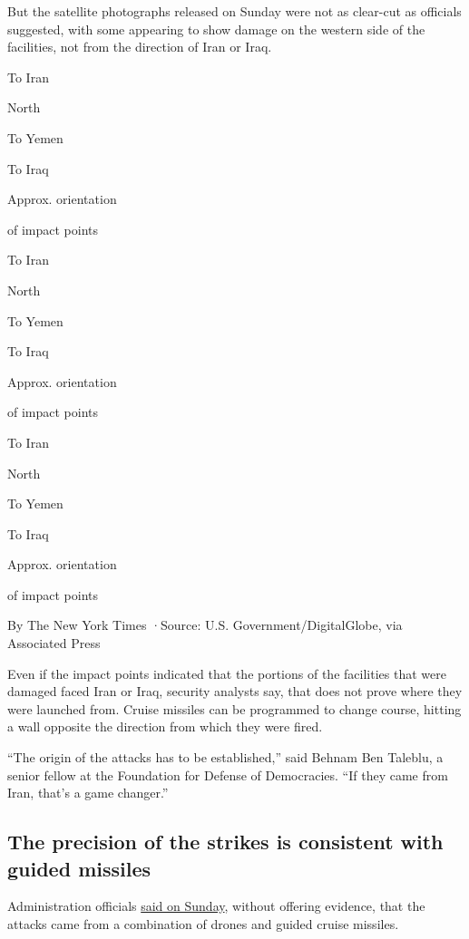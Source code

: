 But the satellite photographs released on Sunday were not as clear-cut
as officials suggested, with some appearing to show damage on the
western side of the facilities, not from the direction of Iran or Iraq.

To Iran

North

To Yemen

To Iraq

Approx. orientation

of impact points

To Iran

North

To Yemen

To Iraq

Approx. orientation

of impact points

To Iran

North

To Yemen

To Iraq

Approx. orientation

of impact points

By The New York Times ·Source: U.S. Government/DigitalGlobe, via
Associated Press

Even if the impact points indicated that the portions of the facilities
that were damaged faced Iran or Iraq, security analysts say, that does
not prove where they were launched from. Cruise missiles can be
programmed to change course, hitting a wall opposite the direction from
which they were fired.

``The origin of the attacks has to be established,'' said Behnam Ben
Taleblu, a senior fellow at the Foundation for Defense of Democracies.
``If they came from Iran, that's a game changer.''

\hypertarget{the-precision-of-the-strikes-is-consistent-with-guided-missiles}{%
\subsection{The precision of the strikes is consistent with guided
missiles}\label{the-precision-of-the-strikes-is-consistent-with-guided-missiles}}

Administration officials
\href{https://www.nytimes3xbfgragh.onion/2019/09/15/world/middleeast/iran-us-saudi-arabia-attack.html}{said
on Sunday}, without offering evidence, that the attacks came from a
combination of drones and guided cruise missiles.

